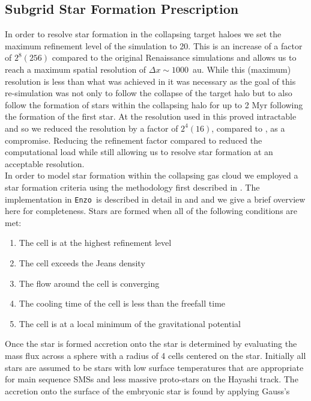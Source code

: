 \documentclass[graphics, twocolumn, usenatbib]{mn2e}
\newcommand{\enzo}{\texttt{Enzo~}}
\begin{document}
 \subsection{Subgrid Star Formation Prescription} \label{Sec:StarFormation}
 \indent In order to resolve star formation in the collapsing target haloes we set the maximum refinement
 level of the simulation to 20. This is an increase of a factor of $2^8 (256)$ compared to the
 original Renaissance simulations and allows us to reach a maximum spatial resolution of $\Delta x \sim 1000$~au.
 While this (maximum) resolution is less than what was achieved
 in \cite{Wise_2019} it was necessary as the goal of this re-simulation was not only to follow the
 collapse of the target halo but to also follow the formation of stars within the collapsing
 halo for up to 2 Myr following the formation of the first star. At the resolution used in
 \cite{Wise_2019} this proved intractable and so we reduced the
 resolution by a factor of $2^4 (16)$, compared to \cite{Wise_2019}, as a compromise. Reducing the
 refinement factor compared to \cite{Wise_2019} reduced the computational load while still allowing us to
 resolve star formation at an acceptable resolution. \\
 \indent In order to model star formation within the collapsing gas cloud we employed a star
 formation criteria using the methodology first described in \cite{Krumholz_2004}. The implementation
 in \enzo is described in detail in \cite{Regan_2018a} and \cite{Regan_2018b} and we give a
 brief overview here for completeness. Stars are formed when all of the following conditions are met:
\begin{enumerate}
\item The cell is at the highest refinement level
\item The cell exceeds the Jeans density 
\item The flow around the cell is converging 
\item The cooling time of the cell is less than the freefall time
\item The cell is at a local minimum of the gravitational potential
\end{enumerate}
Once the star is formed accretion onto the star is determined by evaluating the mass flux across a
sphere with a radius of 4 cells centered on the star. Initially all stars are assumed to be stars with low surface
temperatures that are appropriate for main sequence SMSs and less massive proto-stars on the
Hayashi track. The accretion onto the surface of the embryonic star is found by applying Gauss's
\end{document}
